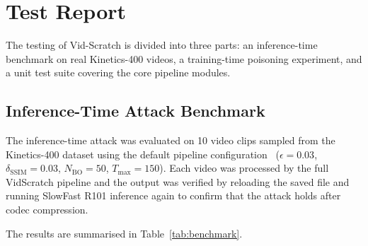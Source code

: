 \section{Test Report}
\label{section:test-report}

The testing of Vid-Scratch is divided into three parts:
an inference-time benchmark on real Kinetics-400 videos,
a training-time poisoning experiment, and a unit test
suite covering the core pipeline modules.

\subsection{Inference-Time Attack Benchmark}
\label{subsection:inference-benchmark}

The inference-time attack was evaluated on 10 video clips
sampled from the Kinetics-400 dataset using the default
pipeline configuration~\cite{kay2017kinetics}
($\epsilon = 0.03$, $\delta_{\text{SSIM}} = 0.03$,
$N_{\text{BO}} = 50$, $T_{\text{max}} = 150$).
Each video was processed by the full VidScratch pipeline
and the output was verified by reloading the saved file
and running SlowFast R101 inference again to confirm
that the attack holds after codec compression.

The results are summarised in Table~\ref{tab:benchmark}.

